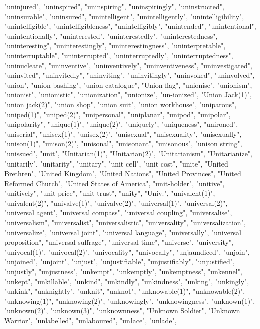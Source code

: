 "uninjured",
"uninspired",
"uninspiring",
"uninspiringly",
"uninstructed",
"uninsurable",
"uninsured",
"unintelligent",
"unintelligently",
"unintelligibility",
"unintelligible",
"unintelligibleness",
"unintelligibly",
"unintended",
"unintentional",
"unintentionally",
"uninterested",
"uninterestedly",
"uninterestedness",
"uninteresting",
"uninterestingly",
"uninterestingness",
"uninterpretable",
"uninterruptable",
"uninterrupted",
"uninterruptedly",
"uninterruptedness",
"uninucleate",
"uninventive",
"uninventively",
"uninventiveness",
"uninvestigated",
"uninvited",
"uninvitedly",
"uninviting",
"uninvitingly",
"uninvoked",
"uninvolved",
"union",
"union-bashing",
"union catalogue",
"Union flag",
"unionise",
"unionism",
"unionist",
"unionistic",
"unionization",
"unionize",
"un-ionized",
"Union Jack(1)",
"union jack(2)",
"union shop",
"union suit",
"union workhouse",
"uniparous",
"uniped(1)",
"uniped(2)",
"unipersonal",
"uniplanar",
"unipod",
"unipolar",
"unipolarity",
"unique(1)",
"unique(2)",
"uniquely",
"uniqueness",
"unironed",
"uniserial",
"unisex(1)",
"unisex(2)",
"unisexual",
"unisexuality",
"unisexually",
"unison(1)",
"unison(2)",
"unisonal",
"unisonant",
"unisonous",
"unison string",
"unissued",
"unit",
"Unitarian(1)",
"Unitarian(2)",
"Unitarianism",
"Unitarianize",
"unitarily",
"unitarity",
"unitary",
"unit cell",
"unit cost",
"unite",
"United Brethren",
"United Kingdom",
"United Nations",
"United Provinces",
"United Reformed Church",
"United States of America",
"unit-holder",
"unitive",
"unitively",
"unit price",
"unit trust",
"unity",
"Univ.",
"univalent(1)",
"univalent(2)",
"univalve(1)",
"univalve(2)",
"universal(1)",
"universal(2)",
"universal agent",
"universal compass",
"universal coupling",
"universalise",
"universalism",
"universalist",
"universalistic",
"universality",
"universalization",
"universalize",
"universal joint",
"universal language",
"universally",
"universal proposition",
"universal suffrage",
"universal time",
"universe",
"university",
"univocal(1)",
"univocal(2)",
"univocality",
"univocally",
"unjaundiced",
"unjoin",
"unjoined",
"unjoint",
"unjust",
"unjustifiable",
"unjustifiably",
"unjustified",
"unjustly",
"unjustness",
"unkempt",
"unkemptly",
"unkemptness",
"unkennel",
"unkept",
"unkillable",
"unkind",
"unkindly",
"unkindness",
"unking",
"unkingly",
"unkink",
"unknightly",
"unknit",
"unknot",
"unknowable(1)",
"unknowable(2)",
"unknowing(1)",
"unknowing(2)",
"unknowingly",
"unknowingness",
"unknown(1)",
"unknown(2)",
"unknown(3)",
"unknownness",
"Unknown Soldier",
"Unknown Warrior",
"unlabelled",
"unlaboured",
"unlace",
"unlade",
